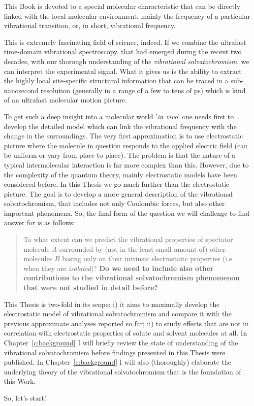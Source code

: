 \documentclass[a4paper,titlepage,twoside,fleqn,12pt]{book}
\begin{document}
\begin{refsection}
This Book is devoted to a special molecular characteristic 
that can be directly linked with the local molecular environment, mainly
the frequency of a particular vibrational transition, or, in short, 
vibrational frequency. 

This is extremely fascinating field of science, indeed. If we combine the
ultrafast time-domain vibrational spectroscopy, that had emerged during the recent
two decades\citep{Book-Cho.TwoDimensionalOpticalSpectroscopy.2009}, 
with our thorough understanding of the \emph{vibrational solvatochromism},
we can interpret the experimental signal. What it gives us is the 
ability to extract the highly local site-specific structural information
that can be traced in a sub-nanosecond resolution (generally in a range of
a few to tens of ps) which is kind of an ultrafast molecular motion picture.

To get such a deep insight into a molecular world '\emph{in vivo}' one needs
first to develop the detailed model which can link the vibrational frequency
with the change in the surroundings. The very first approximation is to use
electrostatic picture where the molecule in question responds to the applied
electric field (can be uniform or vary from place to place). The problem is that
the nature of a typical intermolecular interaction is far more complex than this. However, 
due to the complexity of the quantum theory, mainly electrostatic models
have been considered before. In this Thesis we go much further than the
electrostatic picture. The goal is to develop 
a more general description of the vibrational solvatochromism, that includes
not only Coulombic forces, but also other important phenomena. 
So, the final form of the 
question we will challenge to find answer for is as follows:
%
\begin{quote}
To what extent can we predict the vibrational properties of spectator molecule $A$ 
surrounded by (not in the least small amount of) other molecules $B$
basing only on their intrinsic electrostatic properties 
(i.e. when they are \emph{isolated})? \textbf{Do we need to include also other
contributions to the vibrational solvatochromism phenomenon that were not studied
in detail before?}
\end{quote}
%

This Thesis is two-fold in its scope: i) it aims to maximally develop
the electrostatic model of vibrational solvatochromism and compare it
with the previous approximate analyses reported so far; ii) to
study effects that are not in correlation with electrostatic properties
of solute and solvent molecules at all. In Chapter~\ref{c:background} I will 
briefly review the state of understanding of the vibrational solvatochromism
before findings presented in this Thesis were published. In Chapter~\ref{c:background}
I will also (thoroughly) elaborate the underlying theory of the vibrational
solvatochromism that is the foundation of this Work. 

So, let's start!

\printbibliography[heading=subbibintoc,title={References}]
\end{refsection}
\end{document}
